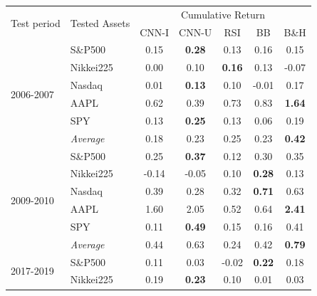 \documentclass[11pt, a4paper]{article}
\begin{document}
\begin{table}[H]
\centering
\begin{tabular}{l|l|ccccc}
\multicolumn{1}{m{1cm}|}{\multirow{2}{1cm}{Test period}} & \multicolumn{1}{m{1.5cm}|}{\multirow{2}{1.5cm}{Tested Assets}} &       \multicolumn{5}{c}{Cumulative Return}  \\ \cline{3-7}
  &                  &  CNN-I         & CNN-U         & RSI           & BB            & B\&H \\ \hline \hline
\multirow{6}{1cm}{2006-2007}  & S\&P500          & 0.15              & \textbf{0.28} & 0.13          & 0.16          & 0.15          \\
  & Nikkei225        & 0.00              & 0.10          & \textbf{0.16} & 0.13          & -0.07         \\
  & Nasdaq           & 0.01              & \textbf{0.13} & 0.10          & -0.01         & 0.17          \\
  & AAPL             & 0.62              & 0.39          & 0.73          & 0.83          & \textbf{1.64} \\
  & SPY              & 0.13              & \textbf{0.25} & 0.13          & 0.06          & 0.19          \\ \cline{2-7}
  & \textit{Average} & 0.18              & 0.23          & 0.25          & 0.23          & \textbf{0.42} \\ \hline
\multirow{6}{1cm}{2009-2010} & S\&P500          & 0.25              & \textbf{0.37} & 0.12          & 0.30          & 0.35          \\
  & Nikkei225        & -0.14             & -0.05         & 0.10          & \textbf{0.28} & 0.13          \\
  & Nasdaq           & 0.39              & 0.28          & 0.32          & \textbf{0.71} & 0.63          \\
  & AAPL             & 1.60              & 2.05          & 0.52          & 0.64          & \textbf{2.41} \\
  & SPY              & 0.11              & \textbf{0.49} & 0.15          & 0.16          & 0.41          \\ \cline{2-7}
  & \textit{Average} & 0.44              & 0.63          & 0.24          & 0.42          & \textbf{0.79} \\ \hline
\multirow{6}{1cm}{2017-2019} &  S\&P500          & 0.11              & 0.03          & -0.02         & \textbf{0.22} & 0.18          \\
  & Nikkei225        & 0.19              & \textbf{0.23} & 0.10          & 0.01          & 0.03          \\

\end{tabular}
\end{table}
\end{document}
